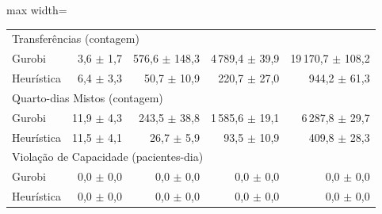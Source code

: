 \begin{table}[htbp]
\begin{adjustbox}{max width=\textwidth}
\begin{tabular}{lrrrr}
        \multicolumn{5}{l}{Transferências (contagem)} \\
        \quad Gurobi & 3,6 $\pm$ 1,7 & 576,6 $\pm$ 148,3 & 4\,789,4 $\pm$ 39,9 & 19\,170,7 $\pm$ 108,2 \\
        \quad Heurística & 6,4 $\pm$ 3,3 & 50,7 $\pm$ 10,9 & 220,7 $\pm$ 27,0 & 944,2 $\pm$ 61,3 \\
        \multicolumn{5}{l}{Quarto-dias Mistos (contagem)} \\
        \quad Gurobi & 11,9 $\pm$ 4,3 & 243,5 $\pm$ 38,8 & 1\,585,6 $\pm$ 19,1 & 6\,287,8 $\pm$ 29,7 \\
        \quad Heurística & 11,5 $\pm$ 4,1 & 26,7 $\pm$ 5,9 & 93,5 $\pm$ 10,9 & 409,8 $\pm$ 28,3 \\
        \multicolumn{5}{l}{Violação de Capacidade (pacientes-dia)} \\
        \quad Gurobi & 0,0 $\pm$ 0,0 & 0,0 $\pm$ 0,0 & 0,0 $\pm$ 0,0 & 0,0 $\pm$ 0,0 \\
        \quad Heurística & 0,0 $\pm$ 0,0 & 0,0 $\pm$ 0,0 & 0,0 $\pm$ 0,0 & 0,0 $\pm$ 0,0 \\
        \hline
    \end{tabular}
    \end{adjustbox}
\end{table}
